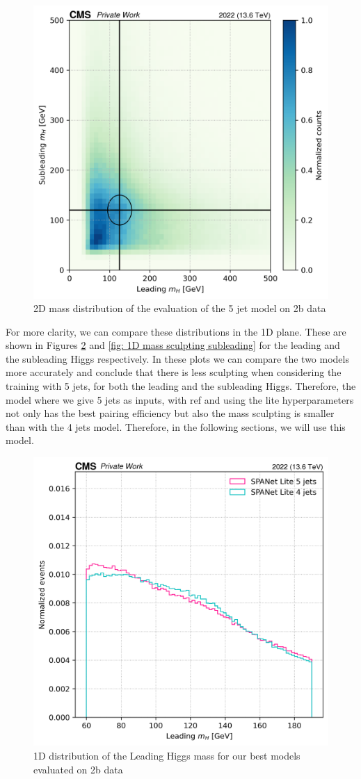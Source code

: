 \begin{figure}[hbt]
    \centering
    \includegraphics[width=0.6\linewidth]{Images/6.Improving/Mass sculpting/mass sculptimg 5j.png}
    \caption{2D mass distribution of the evaluation of the 5 jet model on 2b data}
    \label{fig: 2D mass sculpting for 5j}
\end{figure}


For more clarity, we can compare these distributions in the 1D plane. These are shown in Figures \ref{fig: 1D mass sculpting leading} and \ref{fig: 1D mass sculpting subleading} for the leading and the subleading Higgs respectively. In these plots we can compare the two models more accurately and conclude that there is less sculpting when considering the training with 5 jets, for both the leading and the subleading Higgs. Therefore, the model where we give 5 jets as inputs, with \pt ref and using the lite hyperparameters not only has the best pairing efficiency but also the mass sculpting is smaller than with the 4 jets model. Therefore, in the following sections, we will use this model.

\begin{figure}[hbt]
    \centering
    \includegraphics[width=0.6\linewidth]{Images/6.Improving/Mass sculpting/lead h sculpting.png}
    \caption{1D distribution of the Leading Higgs mass for our best models evaluated on 2b data}
    \label{fig: 1D mass sculpting leading}
\end{figure}

